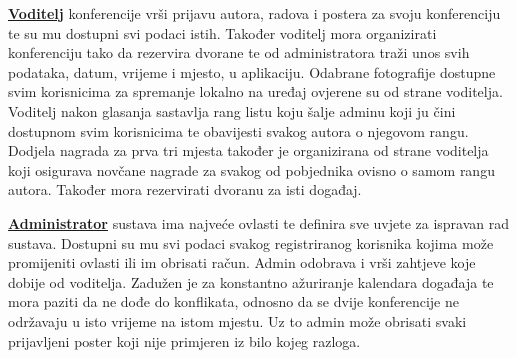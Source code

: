 		\textbf{\underline{Voditelj}} konferencije vrši prijavu autora, radova i postera za svoju konferenciju te su mu dostupni svi podaci istih. Također voditelj mora organizirati konferenciju tako da rezervira dvorane te od administratora traži unos svih podataka, datum, vrijeme i mjesto, u aplikaciju. Odabrane fotografije dostupne svim korisnicima za spremanje lokalno na uređaj ovjerene su od strane voditelja. Voditelj nakon glasanja sastavlja rang listu koju šalje adminu koji ju čini dostupnom svim korisnicima te obavijesti svakog autora o njegovom rangu. Dodjela nagrada za prva tri mjesta također je organizirana od strane voditelja koji osigurava novčane nagrade za svakog od pobjednika ovisno o samom rangu autora. Također mora rezervirati dvoranu za isti događaj.
		
		\textbf{\underline{Administrator}} sustava ima najveće ovlasti te definira sve uvjete za ispravan rad sustava. Dostupni su mu svi podaci svakog registriranog korisnika kojima može promijeniti ovlasti ili im obrisati račun. Admin odobrava i vrši zahtjeve koje dobije od voditelja. Zadužen je za konstantno ažuriranje kalendara događaja te mora paziti da ne dođe do konflikata, odnosno da se dvije konferencije ne održavaju u isto vrijeme na istom mjestu. Uz to admin može obrisati svaki prijavljeni poster koji nije primjeren iz bilo kojeg razloga.

		

				

		
	